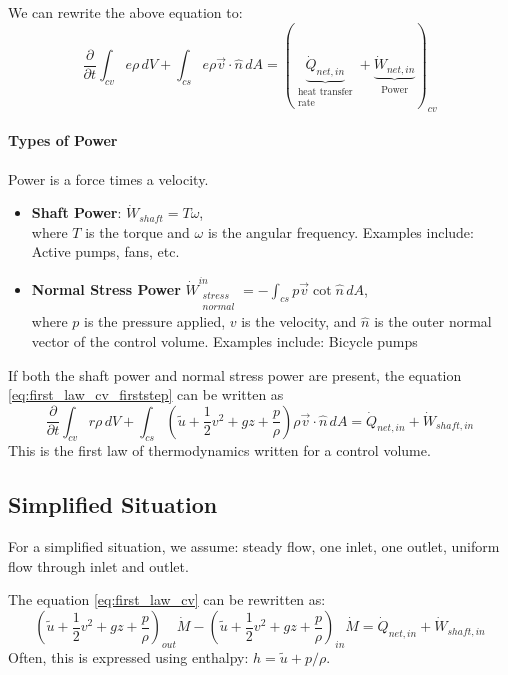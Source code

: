 We can rewrite the above equation to:
\begin{equation}
	\frac{\partial}{\partial t}\int_{cv} e\rho\,dV + \int_{cs}e\rho\vec v\cdot \hat n \,dA =\left(\underbrace{\dot Q_{net,in}}_{\substack{\text{heat transfer}\\\text{rate}}} + \underbrace{\dot W_{net,in}}_{\substack{\text{Power}}}\right)_{cv}
	\label{eq:first_law_cv_firststep}
\end{equation}

\paragraph{Types of Power}
Power is a force times a velocity.
\begin{itemize}
	\setlength{\itemsep}{-5pt}
	\item \textbf{Shaft Power}: $\dot W_{shaft} = T \omega$,\\where $T$ is the torque and $\omega$ is the angular frequency. Examples include: Active pumps, fans, etc.
	\item \textbf{Normal Stress Power}	 $\dot W_{\substack{stress\\normal}}^{in} = -\int_{cs}p\vec v \cot \hat n \,dA$,\\where $p$ is the pressure applied, $v$ is the velocity, and $\hat n$ is the outer normal vector of the control volume. Examples include: Bicycle pumps
\end{itemize}

If both the shaft power and normal stress power are present, the equation \eqref{eq:first_law_cv_firststep} can be written as
\begin{equation}
	\boxed{\frac{\partial}{\partial t}\int_{cv}r\rho\,dV + \int_{cs} \left(\tilde u + \frac 12 v^2 + gz + \frac p\rho\right)\rho\vec v\cdot \hat n \,dA = \dot Q_{net,in} +\dot W_{shaft,in}}
	\label{eq:first_law_cv}
\end{equation}
This is the first law of thermodynamics written for a control volume.

\subsection{Simplified Situation}
For a simplified situation, we assume: steady flow, one inlet, one outlet, uniform flow through inlet and outlet.

The equation \eqref{eq:first_law_cv} can be rewritten as:
\begin{equation*}
	\boxed{\left(\tilde u+\frac 12 v^2+gz+\frac p\rho \right)_{out}\dot M - \left(\tilde u+\frac 12 v^2+gz+\frac p\rho \right)_{in}\dot M = \dot Q_{net,in} +\dot W_{shaft,in}}
\end{equation*}
Often, this is expressed using enthalpy: $h=\tilde u + p/\rho$.

